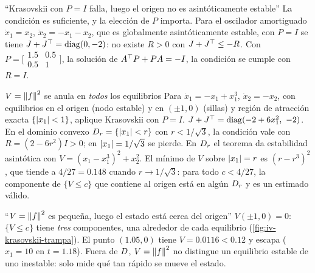 \begin{trampa}[label=tr:iv-PI]{``Krasovskii con $P=I$ falla, luego el origen no es asintóticamente estable''}
La condición es suficiente, y la elección de $P$ importa. Para el oscilador amortiguado $\dot x_1=x_2$, $\dot x_2=-x_1-x_2$, que es globalmente asintóticamente estable, con $P=I$ se tiene $J+J^{\top}=\operatorname{diag}(0,-2)$: no existe $R>0$ con $J+J^{\top}\le-R$. Con $P=\bigl[\begin{smallmatrix}1.5&0.5\\0.5&1\end{smallmatrix}\bigr]$, la solución de $A^{\top} P+PA=-I$, la condición se cumple con $R=I$.
\end{trampa}


\begin{ejemplo}[label=ej:iv-k2]{$V=\left\lVert f\right\rVert^2$ se anula en \emph{todos} los equilibrios}
Para $\dot x_1=-x_1+x_1^3$, $\dot x_2=-x_2$, con equilibrios en el origen (nodo estable) y en $(\pm1,0)$ (sillas) y región de atracción exacta $\{\left\lvert x_1\right\rvert<1\}$, aplique Krasovskii con $P=I$.
\solucion $J+J^{\top}=\operatorname{diag}(-2+6x_1^2,\ -2)$. En el dominio convexo $D_r=\{\left\lvert x_1\right\rvert<r\}$ con $r<1/\sqrt3$, la condición vale con $R=(2-6r^2)I>0$; en $\left\lvert x_1\right\rvert=1/\sqrt3$ se pierde. En $D_r$ el teorema da estabilidad asintótica con $V=(x_1-x_1^3)^2+x_2^2$. El mínimo de $V$ sobre $\left\lvert x_1\right\rvert=r$ es $(r-r^3)^2$, que tiende a $4/27=0.148$ cuando $r\to1/\sqrt3$: para todo $c<4/27$, la componente de $\{V\le c\}$ que contiene al origen está en algún $D_r$ y es un estimado válido.
\end{ejemplo}

\begin{trampa}[label=tr:iv-normaf]{``$V=\left\lVert f\right\rVert^2$ es pequeña, luego el estado está cerca del origen''}
$V(\pm1,0)=0$: $\{V\le c\}$ tiene \emph{tres} componentes, una alrededor de cada equilibrio (\cref{fig:iv-krasovskii-trampa}). El punto $(1.05,0)$ tiene $V=0.0116<0.12$ y escapa ($x_1=10$ en $t=1.18$). Fuera de $D$, $V=\left\lVert f\right\rVert^2$ no distingue un equilibrio estable de uno inestable: solo mide qué tan rápido se mueve el estado.
\end{trampa}

